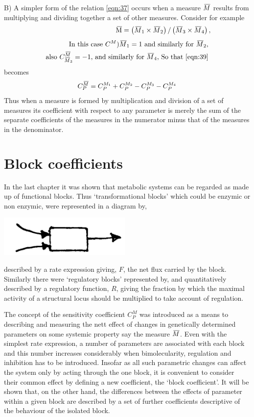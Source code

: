 B) A simpler form of the relation \eqref{eqn:37} occurs when a measure $\,\overline{\!{M}}$ results from multiplying and dividing together a set of other measures. Consider for example
%
$$
\begin{aligned}
\olsi{\mathrm{M}}=\left(\olsi{M}_{1} \times \olsi{M}_{2}\right) /\left(\olsi{M}_{3} \times \olsi{M}_{4}\right), \\[4pt]
\text { In this case } C^{M}){\olsi{M}_1} = 1 \text { and similarly for } \olsi{M}_{2} \text {, } \\
\text { also } C^{\olsi{M}}_{\olsi{M}_3} = -1 \text {, and similarly for } \olsi{M}_{4} \text {, So that \eqref{eqn:39} } \\
\end{aligned}
$$
becomes
%
\begin{equation}
C_{P}^{\,\overline{\!{M}}} = C_{P}^{M_1} + C_{P}^{M_{2}} - C_{P}^{M_{3}}- C_{P}^{M_{4}}
\label{eqn:311}
\end{equation}
%
Thus when a measure is formed by multiplication and division of a set of measures its coefficient with respect to any parameter is merely the sum of the separate coefficients of the measures in the numerator minus that of the measures in the denominator.

\section{Block coefficients}

In the last chapter it was shown that metabolic systems can be regarded as made up of functional blocks. Thus `transformational blocks' which could be enzymic or non enzymic, were represented in a diagram by,

\centerline{\includegraphics[scale=0.7]{figure3_block.png}}

described by a rate expression giving, $F$, the net flux carried by the block. Similarly there were `regulatory blocks' represented by, \scalebox{2}{$\diamond$} and quantitatively described by a regulatory function, $R$, giving the fraction by which the maximal activity of a structural locus should be multiplied to take account of regulation.

The concept of the sensitivity coefficient $C_{P}^{M}$ was introduced as a means to describing and measuring the nett effect of changes in genetically determined parameters on some systemic property say the measure $\,\overline{\!{M}}$. Even with the simplest rate expression, a number of parameters are associated with each block and this number increases considerably when bimolecularity, regulation and inhibition has to be introduced. Insofar as all such parametric changes can affect the system only by acting through the one block, it is convenient to consider their common effect by defining a new coefficient, the `block coefficient'. It will be shown that, on the other hand, the differences between the effects of parameter within a given block are described by a set of further coefficients descriptive of the behaviour of the isolated block.

